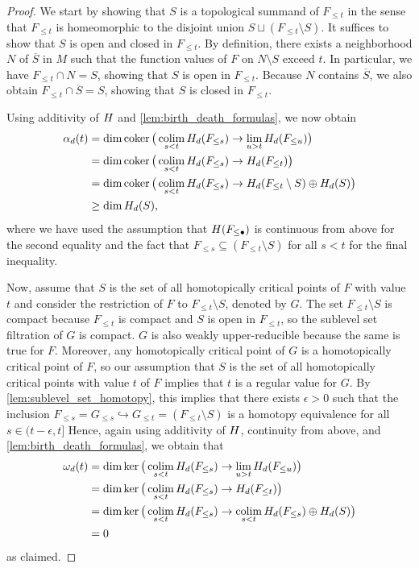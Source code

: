 \begin{proof}
	We start by showing that $S$ is a topological summand of $F_{\leq t}$ in the sense that $F_{\leq t}$ is homeomorphic to the disjoint union $S \sqcup (F_{\leq t} \setminus S)$.
	It suffices to show that $S$ is open and closed in $F_{\leq t}$.
	By definition, there exists a neighborhood $N$ of $\overline{S}$ in $M$ such that the function values of $F$ on $N \setminus S$ exceed $t$.
	In particular, we have $F_{\leq t} \cap N = S$, showing that $S$ is open in $F_{\leq t}$.
	Because $N$ contains $\overline{S}$, we also obtain $F_{\leq t} \cap \overline{S} = S$, showing that $S$ is closed in $F_{\leq t}$.

	Using additivity of $H$ and \cref{lem:birth_death_formulas}, we now obtain
	\begin{align*}
		\alpha_d(t) &= \dim \operatorname{coker} \big( \operatorname*{colim}_{s < t} H_d(F_{\leq s}) \to \lim_{u > t} H_d(F_{\leq u}) \big) \\
			&= \dim \operatorname{coker} \big( \operatorname*{colim}_{s < t} H_d(F_{\leq s}) \to H_d(F_{\leq t}) \big) \\
			&= \dim \operatorname{coker} \big( \operatorname*{colim}_{s < t} H_d(F_{\leq s}) \to H_d(F_{\leq t} \setminus S) \oplus H_d(S) \big) \\
			&\geq \dim H_d(S),
	\end{align*}
	where we have used the assumption that $H(F_{\leq \bullet})$ is continuous from above for the second equality and the fact that $F_{\leq s} \subseteq (F_{\leq t} \setminus S)$ for all $s < t$ for the final inequality.

	Now, assume that $S$ is the set of all homotopically critical points of $F$ with value~$t$ and consider the restriction of $F$ to $F_{\leq t} \setminus S$, denoted by $G$.
	The set $F_{\leq t} \setminus S$ is compact because $F_{\leq t}$ is compact and $S$ is open in $F_{\leq t}$, so the sublevel set filtration of $G$ is compact.
	$G$ is also weakly upper-reducible because the same is true for $F$.
	Moreover, any homotopically critical point of $G$ is a homotopically critical point of $F$, so our assumption that $S$ is the set of all homotopically critical points with value $t$ of $F$ implies that $t$ is a regular value for $G$.
	By \cref{lem:sublevel_set_homotopy},  this implies that there exists $\epsilon > 0$ such that the inclusion $F_{\leq s} = G_{\leq s} \hookrightarrow G_{\leq t} = (F_{\leq t} \setminus S)$ is a homotopy equivalence for all $s \in (t - \epsilon, t]$
	Hence, again using additivity of $H$, continuity from above, and \cref{lem:birth_death_formulas}, we obtain that
	\begin{align*}
		\omega_d(t) &= \dim \ker \big( \operatorname*{colim}_{s < t} H_d(F_{\leq s}) \to \lim_{u > t} H_d(F_{\leq u}) \big) \\
				&= \dim \ker \big( \operatorname*{colim}_{s < t} H_d(F_{\leq s}) \to H_d(F_{\leq t}) \big) \\
				&= \dim \ker \big( \operatorname*{colim}_{s < t} H_d(F_{\leq s}) \to \operatorname*{colim}_{s < t} H_d(F_{\leq s}) \oplus H_d(S) \big) \\
				&= 0
	\end{align*}
	as claimed.
\end{proof}

